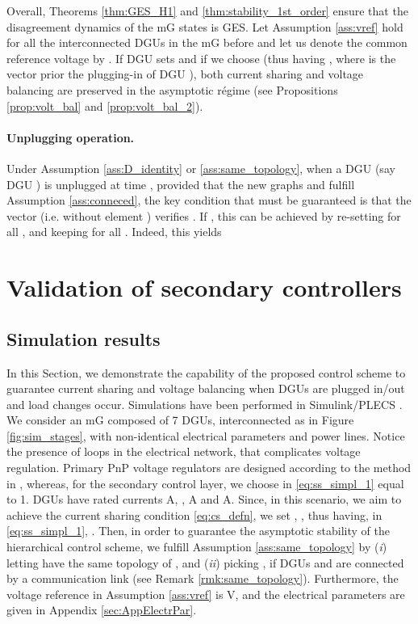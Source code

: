 \documentclass[a4paper]{article}
\theoremstyle{plain}
\begin{document}
Overall, Theorems \ref{thm:GES_H1} and
\ref{thm:stability_1st_order} ensure that the disagreement dynamics of
the mG states is GES.
Let Assumption \ref{ass:vref}
hold for all the interconnected DGUs in the mG before  and let
us denote the common reference voltage by . If DGU  sets
 and if we choose  (thus having , where  is the
vector  prior the plugging-in of DGU ), both current sharing and
voltage balancing are preserved in the asymptotic r\'{e}gime (see Propositions
\ref{prop:volt_bal} and \ref{prop:volt_bal_2}). 

\paragraph{Unplugging operation.} Under Assumption \ref{ass:D_identity} or \ref{ass:same_topology}, when a DGU (say DGU ) is
unplugged at time , provided that the new graphs  and  fulfill Assumption \ref{ass:conneced}, the key condition that must
be guaranteed is that the vector 
(i.e.  without element ) verifies
. If , this can be achieved by re-setting  for all , and keeping  for all . Indeed, this yields




\section{Validation of secondary controllers}
\subsection{Simulation results}
\label{sec:simulations}
In this Section, we demonstrate the capability of the proposed control
scheme to guarantee current sharing and voltage balancing when DGUs are plugged in/out and load changes occur. Simulations have been performed in Simulink/PLECS \cite{allmeling2013plecs}.
We consider an mG composed of 7 DGUs, interconnected as in Figure
	\ref{fig:sim_stages}, with non-identical electrical parameters and power lines. Notice the presence of loops in the electrical network, that complicates voltage regulation. Primary PnP voltage regulators are designed according to the method in \cite{tucci2015decentralized}, whereas, for the secondary control layer, we choose  in \eqref{eq:ss_simpl_1} equal to 1. DGUs have rated currents  A, ,  A and  A. Since, in this scenario, we aim to achieve the current sharing condition \eqref{eq:cs_defn}, we set , , thus having, in \eqref{eq:ss_simpl_1}, . Then, in order to guarantee the asymptotic stability of the hierarchical control scheme, we fulfill Assumption \ref{ass:same_topology} by (\textit{i}) letting  have the same topology of , and (\textit{ii}) picking , if DGUs  and  are connected by a communication link (see Remark \ref{rmk:same_topology}). Furthermore, the voltage reference in Assumption \ref{ass:vref} is  V, and the electrical parameters are given in Appendix \ref{sec:AppElectrPar}.
 
\end{document}
